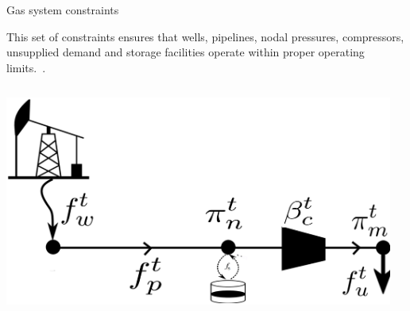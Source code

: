 \documentclass[hyperref={colorlinks,citecolor=blue,linkcolor=blue,urlcolor=blue}]{beamer}
\begin{document}
\begin{frame}{Gas system constraints}

This set of constraints ensures that wells, pipelines, nodal pressures, compressors, unsupplied demand and storage facilities operate within proper operating limits.~\cite{MPNG}.

\begin{columns}
\begin{column}{0.24\textwidth}
    \includegraphics[width=1.5\textwidth]{figures/gas_dummy.png}
\end{column}
\begin{column}{0.8\textwidth}  %


\end{column}
\end{columns}
\end{frame}
\end{document}
